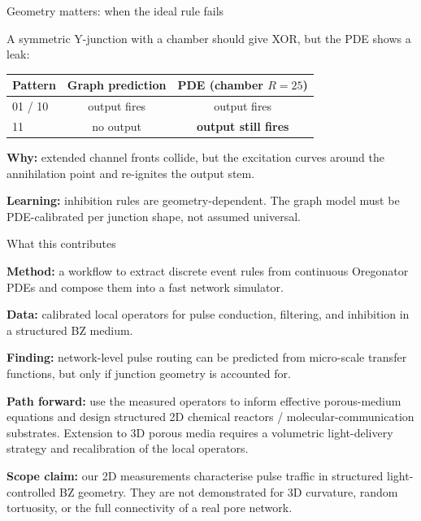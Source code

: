 \documentclass[aspectratio=169,11pt]{beamer}
\begin{document}
\begin{frame}{Geometry matters: when the ideal rule fails}

A symmetric Y-junction with a chamber should give XOR, but the PDE shows a leak:

\vspace{0.3cm}
\begin{table}
\centering
\footnotesize
\begin{tabular}{lcc}
\toprule
\textbf{Pattern} & \textbf{Graph prediction} & \textbf{PDE (chamber $R = 25$)} \\
\midrule
01 / 10 & output fires & output fires \\
11 & no output & \textbf{output still fires} \\
\bottomrule
\end{tabular}
\end{table}

\vspace{0.3cm}
\textbf{Why:} extended channel fronts collide, but the excitation curves around the annihilation point and re-ignites the output stem.

\vspace{0.3cm}
\textbf{Learning:} inhibition rules are geometry-dependent. The graph model must be PDE-calibrated per junction shape, not assumed universal.

\end{frame}

\begin{frame}{What this contributes}

\textbf{Method:} a workflow to extract discrete event rules from continuous Oregonator PDEs and compose them into a fast network simulator.

\vspace{0.3cm}
\textbf{Data:} calibrated local operators for pulse conduction, filtering, and inhibition in a structured BZ medium.

\vspace{0.3cm}
\textbf{Finding:} network-level pulse routing can be predicted from micro-scale transfer functions, but only if junction geometry is accounted for.

\vspace{0.3cm}
\textbf{Path forward:} use the measured operators to inform effective porous-medium equations and design structured 2D chemical reactors / molecular-communication substrates. Extension to 3D porous media requires a volumetric light-delivery strategy and recalibration of the local operators.

\vspace{0.3cm}
\textbf{Scope claim:} our 2D measurements characterise pulse traffic in structured light-controlled BZ geometry. They are not demonstrated for 3D curvature, random tortuosity, or the full connectivity of a real pore network.

\end{frame}
\end{document}

